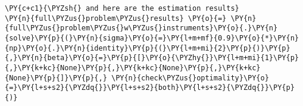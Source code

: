     \begin{tcolorbox}[breakable, size=fbox, boxrule=1pt, pad at break*=1mm,colback=cellbackground, colframe=cellborder]
\begin{Verbatim}[commandchars=\\\{\}]
\PY{c+c1}{\PYZsh{} and here are the estimation results}
\PY{n}{full\PYZus{}problem\PYZus{}results} \PY{o}{=} \PY{n}{full\PYZus{}problem\PYZus{}w\PYZus{}instruments}\PY{o}{.}\PY{n}{solve}\PY{p}{(}\PY{n}{sigma}\PY{o}{=}\PY{l+m+mf}{0.9}\PY{o}{*}\PY{n}{np}\PY{o}{.}\PY{n}{identity}\PY{p}{(}\PY{l+m+mi}{2}\PY{p}{)}\PY{p}{,}\PY{n}{beta}\PY{o}{=}\PY{p}{[}\PY{o}{\PYZhy{}}\PY{l+m+mi}{1}\PY{p}{,}\PY{k+kc}{None}\PY{p}{,}\PY{k+kc}{None}\PY{p}{,}\PY{k+kc}{None}\PY{p}{]}\PY{p}{,} \PY{n}{check\PYZus{}optimality}\PY{o}{=}\PY{l+s+s2}{\PYZdq{}}\PY{l+s+s2}{both}\PY{l+s+s2}{\PYZdq{}}\PY{p}{)}
\end{Verbatim}
\end{tcolorbox}

